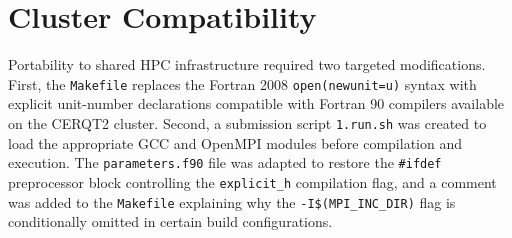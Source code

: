 
\section{Cluster Compatibility}
\label{sec:cluster}

Portability to shared HPC infrastructure required two targeted modifications.
First, the \texttt{Makefile} replaces the Fortran 2008 \texttt{open(newunit=u)}
syntax with explicit unit-number declarations compatible with Fortran 90
compilers available on the CERQT2 cluster. Second, a submission script
\texttt{1.run.sh} was created to load the appropriate GCC and OpenMPI modules
before compilation and execution. The \texttt{parameters.f90} file was adapted
to restore the \texttt{\#ifdef} preprocessor block controlling the
\texttt{explicit\_h} compilation flag, and a comment was added to the
\texttt{Makefile} explaining why the \texttt{-I\$(MPI\_INC\_DIR)} flag is
conditionally omitted in certain build configurations.

